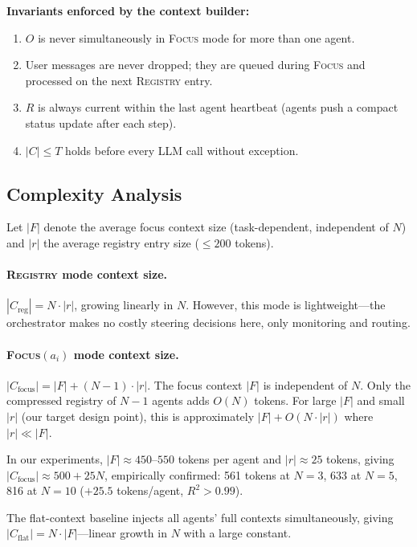 \documentclass{article}
\begin{document}
\noindent\textbf{Invariants enforced by the context builder:}
\begin{enumerate}
  \item $O$ is never simultaneously in \textsc{Focus} mode for more than
  one agent. \label{inv:1}
  \item User messages are never dropped; they are queued during
  \textsc{Focus} and processed on the next \textsc{Registry} entry.
  \item $R$ is always current within the last agent heartbeat (agents push
  a compact status update after each step). \label{inv:3}
  \item $|C| \leq T$ holds before every LLM call without exception. \label{inv:4}
\end{enumerate}

\subsection{Complexity Analysis}
\label{sec:complexity}

Let $|F|$ denote the average focus context size (task-dependent, independent
of $N$) and $|r|$ the average registry entry size ($\leq 200$ tokens).

\paragraph{\textsc{Registry} mode context size.}
$|C_{\text{reg}}| = N \cdot |r|$, growing linearly in $N$.
However, this mode is lightweight—the orchestrator makes no costly
steering decisions here, only monitoring and routing.

\paragraph{\textsc{Focus}$(a_i)$ mode context size.}
$|C_{\text{focus}}| = |F| + (N-1) \cdot |r|$.
The focus context $|F|$ is independent of $N$.
Only the compressed registry of $N-1$ agents adds $O(N)$ tokens.
For large $|F|$ and small $|r|$ (our target design point), this is
approximately $|F| + O(N \cdot |r|)$ where $|r| \ll |F|$.

In our experiments, $|F| \approx 450$--$550$ tokens per agent and
$|r| \approx 25$ tokens, giving $|C_{\text{focus}}| \approx 500 + 25N$,
empirically confirmed: 561 tokens at $N=3$, 633 at $N=5$, 816 at $N=10$
($+25.5$ tokens/agent, $R^2 > 0.99$).

The flat-context baseline injects all agents' full contexts simultaneously,
giving $|C_{\text{flat}}| = N \cdot |F|$—linear growth in $N$ with a
large constant.
\end{document}
